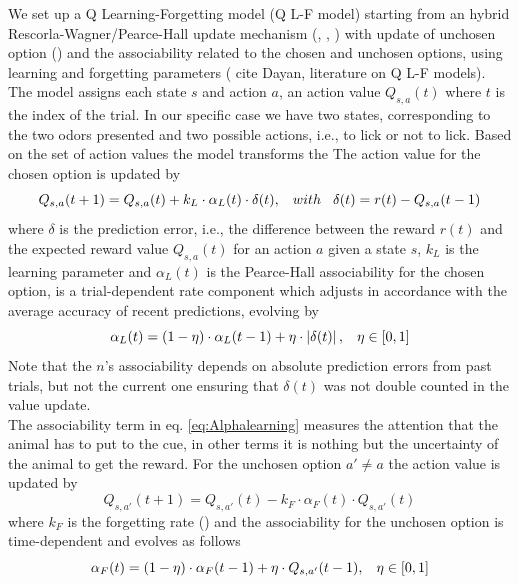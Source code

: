 We set up a Q Learning-Forgetting model (Q L-F model) starting from an hybrid Rescorla-Wagner/Pearce-Hall update mechanism (\cite{Koppe}, \cite{Costa}, \cite{Li}) with update of unchosen option (\cite{Katahira}) and the associability related to the chosen and unchosen options, using learning and forgetting parameters ({\color{red} cite Dayan, literature on Q L-F models}).
The model assigns each state $s$ and action $a$, an action value $Q_{s,a}(t)$ where $t$ is the index of the trial. In our specific case we have two states, corresponding to the two odors presented and two possible actions, i.e., to lick or not to lick. 
Based on the set of action values the model transforms the The action value for the chosen option is updated by
\begin{equation}
Q_{s,a}(t+1)  = Q_{s,a}(t)+k_L\cdot\alpha_L(t)\cdot\delta(t), \hspace{0.3cm} with \hspace{0.3cm}\delta(t)=r(t)-Q_{s,a}(t-1)
\label{eq:Qlearning}
\end{equation}
where $\delta$ is the prediction error, i.e., the difference between the reward $r(t)$ and the expected reward value $Q_{s,a}(t)$ for an action $a$ given a state $s$, $k_L$ is the learning parameter and $\alpha_L(t)$ is the Pearce-Hall associability for the chosen option, is a trial-dependent rate component which adjusts in accordance with the average accuracy of recent predictions, evolving by
\begin{equation}
   \alpha_L(t)=(1-\eta)\cdot\alpha_L(t-1)+\eta\cdot\left\lvert\delta(t)\right\rvert,\hspace{0.3cm} \eta\in[0,1]
    \label{eq:Alphalearning}
\end{equation}
Note that the $n$'s associability depends on absolute prediction errors from past trials, but not the current one ensuring that $\delta(t)$ was not double counted in the value update.\\The associability term in eq. \ref{eq:Alphalearning} measures the attention that the animal has to put to the cue, in other terms it is nothing but the uncertainty of the animal to get the reward. 
For the unchosen option $a'\neq a$ the action value is updated by
\begin{equation}
    Q_{s,a'}(t+1) = Q_{s,a'}(t)-k_F\cdot\alpha_F(t)\cdot Q_{s,a'}(t)
    \label{eq:Qforgetting}
\end{equation}
where $k_F$ is the forgetting rate (\cite{ItoDoya}) and the associability for the unchosen option is time-dependent and evolves as follows
\begin{equation}
    \alpha_F(t)=(1-\eta)\cdot\alpha_F(t-1)+\eta\cdot Q_{s,a'}(t-1), \hspace{0.3cm}
    \eta\in[0,1]
    \label{eq:Alphaforgetting}
\end{equation}
